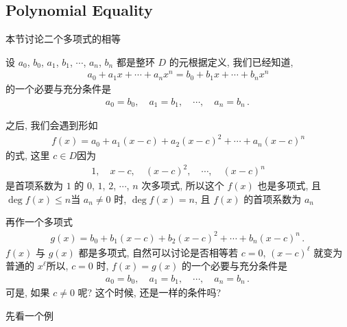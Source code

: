 \subsection*{Polynomial Equality}

本节讨论二个多项式的相等\period

设 $a_0$, $b_0$, $a_1$, $b_1$, $\cdots$, $a_n$, $b_n$ 都是整环 $D$ 的元\period 根据定义, 我们已经知道,
\begin{align*}
    a_0 + a_1 x + \cdots + a_n x^n = b_0 + b_1 x + \cdots + b_n x^n
\end{align*}
的一个必要与充分条件是
\begin{align*}
    a_0 = b_0, \quad a_1 = b_1, \quad \cdots, \quad a_n = b_n \period
\end{align*}

之后, 我们会遇到形如
\begin{align*}
    f(x) = a_0 + a_1 (x - c) + a_2 (x - c)^2 + \cdots + a_n (x - c)^n
\end{align*}
的式, 这里 $c \in D$\period 因为
\begin{align*}
    1, \quad x-c, \quad (x-c)^2, \quad \cdots, \quad (x-c)^n
\end{align*}
是首项系数为 $1$ 的 $0$, $1$, $2$, $\cdots$, $n$ 次多项式, 所以这个 $f(x)$ 也是多项式, 且 $\deg f(x) \leq n$\period 当 $a_n \neq 0$ 时, $\deg f(x) = n$, 且 $f(x)$ 的首项系数为 $a_n$\period

再作一个多项式
\begin{align*}
    g(x) = b_0 + b_1 (x - c) + b_2 (x - c)^2 + \cdots + b_n (x - c)^n \period
\end{align*}
$f(x)$ 与 $g(x)$ 都是多项式, 自然可以讨论是否相等\period 若 $c=0$, $(x-c)^\ell$ 就变为普通的 $x^\ell$\period 所以, $c=0$ 时, $f(x)=g(x)$ 的一个必要与充分条件是
\begin{align*}
    a_0 = b_0, \quad a_1 = b_1, \quad \cdots, \quad a_n = b_n \period
\end{align*}
可是, 如果 $c \neq 0$ 呢? 这个时候, 还是一样的条件吗?

先看一个例\period

